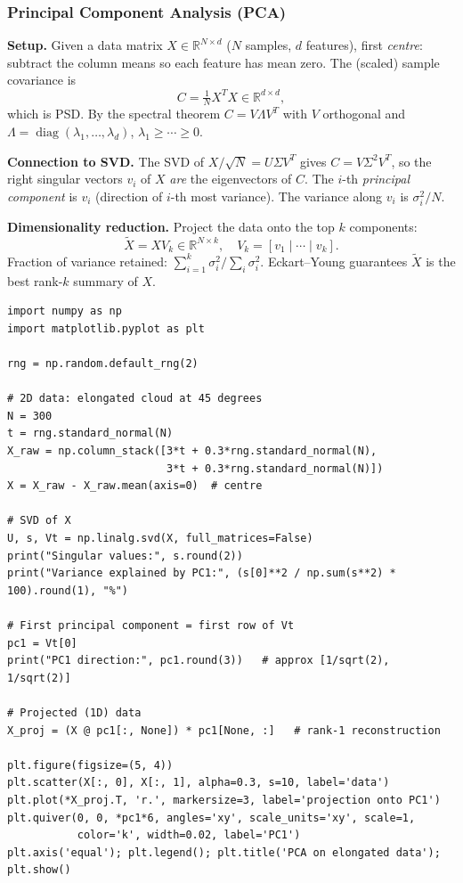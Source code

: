 \documentclass[11pt]{article}
\theoremstyle{definition}
\theoremstyle{plain}
\begin{document}
\subsubsection{Principal Component Analysis (PCA)}

\textbf{Setup.}  Given a data matrix $X\in\mathbb{R}^{N\times d}$ ($N$ samples,
$d$ features), first \emph{centre}: subtract the column means so each feature
has mean zero.  The (scaled) sample covariance is
\[
  C = \tfrac{1}{N}X^TX \in \mathbb{R}^{d\times d},
\]
which is PSD.  By the spectral theorem $C = V\Lambda V^T$ with $V$ orthogonal
and $\Lambda = \operatorname{diag}(\lambda_1,\ldots,\lambda_d)$, $\lambda_1\ge\cdots\ge 0$.

\medskip\noindent
\textbf{Connection to SVD.}  The SVD of $X/\sqrt{N} = U\Sigma V^T$ gives
$C = V\Sigma^2 V^T$, so the right singular vectors $v_i$ of $X$ \emph{are}
the eigenvectors of $C$.  The $i$-th \emph{principal component} is $v_i$
(direction of $i$-th most variance).  The variance along $v_i$ is $\sigma_i^2/N$.

\medskip\noindent
\textbf{Dimensionality reduction.}  Project the data onto the top $k$
components:
\[
  \tilde{X} = X V_k \in \mathbb{R}^{N\times k}, \quad
  V_k = [v_1\mid\cdots\mid v_k].
\]
Fraction of variance retained: $\sum_{i=1}^k \sigma_i^2 / \sum_i \sigma_i^2$.
Eckart--Young guarantees $\tilde{X}$ is the best rank-$k$ summary of $X$.

\begin{lstlisting}
import numpy as np
import matplotlib.pyplot as plt

rng = np.random.default_rng(2)

# 2D data: elongated cloud at 45 degrees
N = 300
t = rng.standard_normal(N)
X_raw = np.column_stack([3*t + 0.3*rng.standard_normal(N),
                         3*t + 0.3*rng.standard_normal(N)])
X = X_raw - X_raw.mean(axis=0)  # centre

# SVD of X
U, s, Vt = np.linalg.svd(X, full_matrices=False)
print("Singular values:", s.round(2))
print("Variance explained by PC1:", (s[0]**2 / np.sum(s**2) * 100).round(1), "%")

# First principal component = first row of Vt
pc1 = Vt[0]
print("PC1 direction:", pc1.round(3))   # approx [1/sqrt(2), 1/sqrt(2)]

# Projected (1D) data
X_proj = (X @ pc1[:, None]) * pc1[None, :]   # rank-1 reconstruction

plt.figure(figsize=(5, 4))
plt.scatter(X[:, 0], X[:, 1], alpha=0.3, s=10, label='data')
plt.plot(*X_proj.T, 'r.', markersize=3, label='projection onto PC1')
plt.quiver(0, 0, *pc1*6, angles='xy', scale_units='xy', scale=1,
           color='k', width=0.02, label='PC1')
plt.axis('equal'); plt.legend(); plt.title('PCA on elongated data'); plt.show()
\end{lstlisting}
\end{document}
